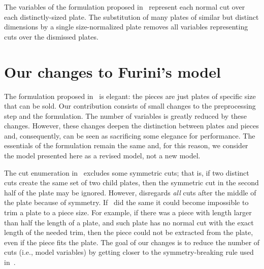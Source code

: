The variables of the formulation proposed in~\cite{furini:2016} represent each normal cut over each distinctly-sized plate.
The substitution of many plates of similar but distinct dimensions by a single size-normalized plate removes all variables representing cuts over the dismissed plates.

\section{Our changes to Furini's model}


The formulation proposed in~\cite{furini:2016} is elegant: the pieces are just plates of specific size that can be sold.
Our contribution consists of small changes to the preprocessing step and the formulation.
The number of variables is greatly reduced by these changes.
However, these changes deepen the distinction between plates and pieces and, consequently, can be seen as sacrificing some elegance for performance.
The essentials of the formulation remain the same and, for this reason, we consider the model presented here as a revised model, not a new model.


The cut enumeration in~\cite{furini:2016} excludes some symmetric cuts; that is, if two distinct cuts create the same set of two child plates, then the symmetric cut in the second half of the plate may be ignored.
However, \cite{nicos:1977} disregards \emph{all} cuts after the middle of the plate because of symmetry.
If~\cite{furini:2016} did the same it could become impossible to trim a plate to a piece size.
For example, if there was a piece with length larger than half the length of a plate, and such plate has no normal cut with the exact length of the needed trim, then the piece could not be extracted from the plate, even if the piece fits the plate.
The goal of our changes is to reduce the number of cuts (i.e., model variables) by getting closer to the symmetry-breaking rule used in~\cite{nicos:1977}.


